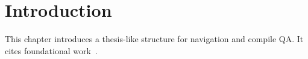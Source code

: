 \chapter{Introduction}
This chapter introduces a thesis-like structure for navigation and compile QA.
It cites foundational work~\cite{thesisqa2026}.
